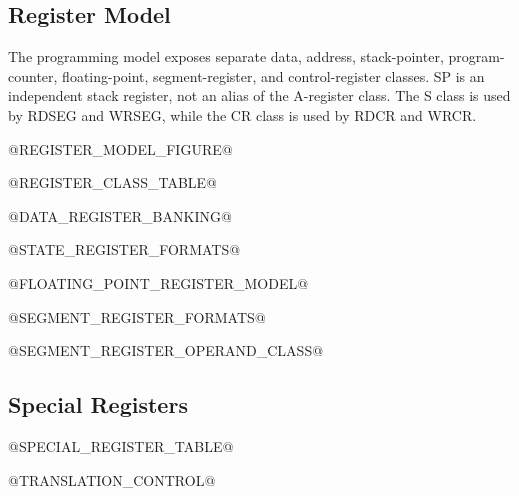 \subsection{Register Model}
The programming model exposes separate data, address, stack-pointer, program-counter, floating-point,
segment-register, and control-register classes. SP is an independent stack register, not an alias of the
A-register class. The S class is used by RDSEG and WRSEG, while the CR class is used by RDCR and WRCR.

@REGISTER_MODEL_FIGURE@

@REGISTER_CLASS_TABLE@

@DATA_REGISTER_BANKING@

@STATE_REGISTER_FORMATS@

@FLOATING_POINT_REGISTER_MODEL@

@SEGMENT_REGISTER_FORMATS@

@SEGMENT_REGISTER_OPERAND_CLASS@

\subsection{Special Registers}
@SPECIAL_REGISTER_TABLE@

@TRANSLATION_CONTROL@
